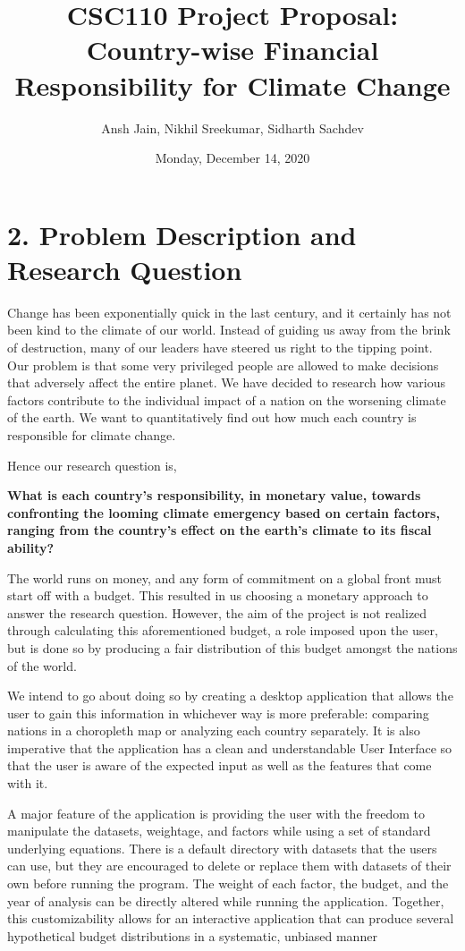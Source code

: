 \documentclass[fontsize=11pt]{article}
\title{CSC110 Project Proposal: Country-wise Financial Responsibility for Climate Change}
\author{Ansh Jain, Nikhil Sreekumar, Sidharth Sachdev}
\date{Monday, December 14, 2020}
\begin{document}
    \maketitle

    \section*{2. Problem Description and Research Question}

    Change has been exponentially quick in the last century, and it certainly has not been kind to the climate of our world. Instead of guiding us away from the brink of destruction, many of our leaders have steered us right to the tipping point. Our problem is that some very privileged people are allowed to make decisions that adversely affect the entire planet. We have decided to research how various factors contribute to the individual impact of a nation on the worsening climate of the earth. We want to quantitatively find out how much each country is responsible for climate change.\newline

    Hence our research question is,

    \textbf{What is each country’s responsibility, in monetary value, towards confronting the looming climate emergency based on certain factors, ranging from the country’s effect on the earth’s climate to its fiscal ability?}\newline

    The world runs on money, and any form of commitment on a global front must start off with a budget. This resulted in us choosing a monetary approach to answer the research question. However, the aim of the project is not realized through calculating this aforementioned budget, a role imposed upon the user, but is done so by producing a fair distribution of this budget amongst the nations of the world.\newline

    We intend to go about doing so by creating a desktop application that allows the user to gain this information in whichever way is more preferable: comparing nations in a choropleth map or analyzing each country separately. It is also imperative that the application has a clean and understandable User Interface so that the user is aware of the expected input as well as the features that come with it.\newline


    A major feature of the application is providing the user with the freedom to manipulate the datasets, weightage, and factors while using a set of standard underlying equations. There is a default directory with datasets that the users can use, but they are encouraged to delete or replace them with datasets of their own before running the program. The weight of each factor, the budget, and the year of analysis can be directly altered while running the application. Together, this customizability allows for an interactive application that can produce several hypothetical budget distributions in a systematic, unbiased manner
\end{document}
